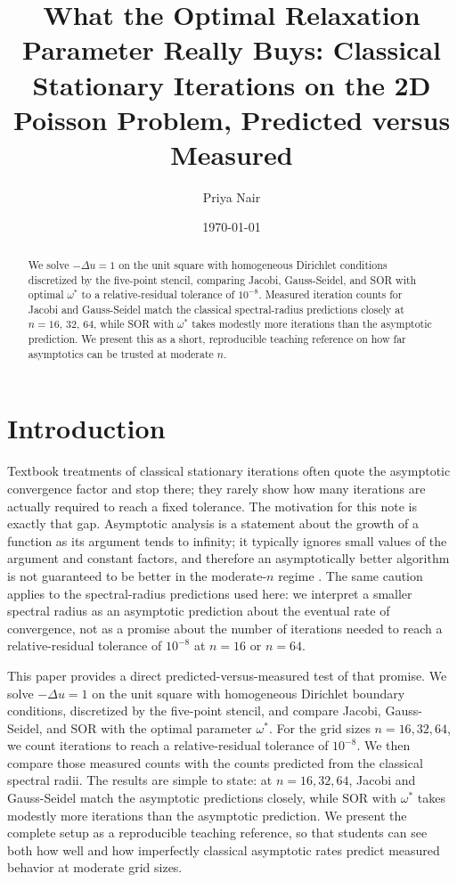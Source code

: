 \documentclass[11pt]{article}
\title{What the Optimal Relaxation Parameter Really Buys: Classical Stationary Iterations on the 2D Poisson Problem, Predicted versus Measured}
\author{Priya Nair}
\date{\today}
\begin{document}
\maketitle
\begin{abstract}
We solve \(-\Delta u = 1\) on the unit square with homogeneous Dirichlet conditions discretized by the five-point stencil, comparing Jacobi, Gauss-Seidel, and SOR with optimal \(\omega^*\) to a relative-residual tolerance of \(10^{-8}\). Measured iteration counts for Jacobi and Gauss-Seidel match the classical spectral-radius predictions closely at \(n=16\), \(32\), \(64\), while SOR with \(\omega^*\) takes modestly more iterations than the asymptotic prediction. We present this as a short, reproducible teaching reference on how far asymptotics can be trusted at moderate \(n\).
\end{abstract}
\section{Introduction}
Textbook treatments of classical stationary iterations often quote the asymptotic convergence factor and stop there; they rarely show how many iterations are actually required to reach a fixed tolerance. The motivation for this note is exactly that gap. Asymptotic analysis is a statement about the growth of a function as its argument tends to infinity; it typically ignores small values of the argument and constant factors, and therefore an asymptotically better algorithm is not guaranteed to be better in the moderate-$n$ regime \cite{2004lecture}. The same caution applies to the spectral-radius predictions used here: we interpret a smaller spectral radius as an asymptotic prediction about the eventual rate of convergence, not as a promise about the number of iterations needed to reach a relative-residual tolerance of \(10^{-8}\) at \(n=16\) or \(n=64\).

This paper provides a direct predicted-versus-measured test of that promise. We solve \(-\Delta u=1\) on the unit square with homogeneous Dirichlet boundary conditions, discretized by the five-point stencil, and compare Jacobi, Gauss-Seidel, and SOR with the optimal parameter \(\omega^*\). For the grid sizes \(n=16,32,64\), we count iterations to reach a relative-residual tolerance of \(10^{-8}\). We then compare those measured counts with the counts predicted from the classical spectral radii. The results are simple to state: at \(n=16,32,64\), Jacobi and Gauss-Seidel match the asymptotic predictions closely, while SOR with \(\omega^*\) takes modestly more iterations than the asymptotic prediction. We present the complete setup as a reproducible teaching reference, so that students can see both how well and how imperfectly classical asymptotic rates predict measured behavior at moderate grid sizes.
\end{document}
